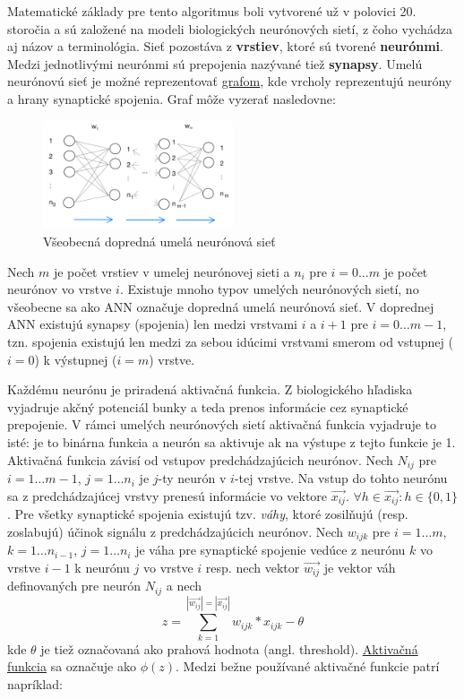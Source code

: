 Matematické základy pre tento algoritmus boli vytvorené už v polovici 20. storočia a sú založené na modeli
biologických neurónových sietí, z čoho vychádza aj názov a terminológia.
Sieť pozostáva z \textbf{vrstiev}, ktoré sú tvorené \textbf{neurónmi}.
Medzi jednotlivými neurónmi sú prepojenia nazývané tiež \textbf{synapsy}.
Umelú neurónovú sieť je možné reprezentovať \hyperref[figure:general-ann]{grafom}, kde vrcholy reprezentujú neuróny
a hrany synaptické spojenia.
Graf môže vyzerať nasledovne:
\begin{figure}[H]
    \centering
    \includegraphics[width=0.5\textwidth]{images/general-ann.jpg}
    \caption{Všeobecná dopredná umelá neurónová sieť}
\end{figure}\label{figure:general-ann}
Nech $m$ je počet vrstiev v umelej neurónovej sieti a $n_i$ pre $i = 0 \dots m$ je počet neurónov vo vrstve $i$.
Existuje mnoho typov umelých neurónových sietí, no všeobecne sa ako ANN označuje dopredná umelá neurónová sieť.
V doprednej ANN existujú synapsy (spojenia) len medzi vrstvami $i$ a $i + 1$ pre $i = 0 \dots m - 1$, tzn. spojenia
existujú len medzi za sebou idúcimi vrstvami smerom od vstupnej ($i=0$) k výstupnej ($i=m$) vrstve.

Každému neurónu je priradená aktivačná funkcia.
Z biologického hľadiska vyjadruje akčný potenciál bunky a teda prenos informácie cez synaptické prepojenie.
V rámci umelých neurónových sietí aktivačná funkcia vyjadruje to isté: je to binárna funkcia a neurón sa aktivuje
ak na výstupe z tejto funkcie je 1.
Aktivačná funkcia závisí od vstupov predchádzajúcich neurónov.
Nech $N_{ij}$ pre $i = 1 \dots m-1$, $j = 1 \dots n_i$ je $j$-ty neurón v $i$-tej vrstve.
Na vstup do tohto neurónu sa z predchádzajúcej vrstvy prenesú informácie vo vektore $\vec{x_{ij}}$.
$\forall h \in \vec{x_{ij}} \colon h \in \{0, 1\}$.
Pre všetky synaptické spojenia existujú tzv. \emph{váhy}, ktoré zosilňujú (resp. zoslabujú) účinok signálu z
predchádzajúcich neurónov.
Nech $w_{ijk}$ pre $i=1 \dots m$, $k=1 \dots n_{i-1}$, $j=1 \dots n_i$ je váha pre synaptické spojenie vedúce z
neurónu $k$ vo vrstve $i-1$ k neurónu $j$ vo vrstve $i$ resp.
nech vektor $\vec{w_{ij}}$ je vektor váh definovaných pre neurón $N_{ij}$ a nech
\begin{equation}
    z = \sum_{k=1}^{|\vec{w_{ij}}|=|\vec{x_{ij}}|}{w_{ijk} * x_{ijk}}-\theta
\end{equation}
kde $\theta$ je tiež označovaná ako prahová hodnota (angl. threshold).
\hyperref[figure:activation-functions]{Aktivačná funkcia} sa označuje ako $\phi(z)$.
Medzi bežne používané aktivačné funkcie patrí napríklad:

